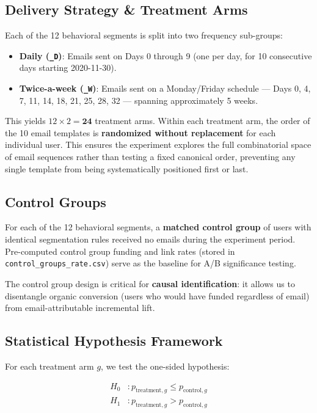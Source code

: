 \documentclass[12pt,a4paper]{article}
\begin{document}
\subsection{Delivery Strategy \& Treatment Arms}

Each of the 12 behavioral segments is split into two frequency sub-groups:

\begin{itemize}[leftmargin=2em]
  \item \textbf{Daily (\texttt{\_D})}: Emails sent on Days 0 through 9 (one per day,
    for 10 consecutive days starting 2020-11-30).
  \item \textbf{Twice-a-week (\texttt{\_W})}: Emails sent on a Monday/Friday schedule —
    Days 0, 4, 7, 11, 14, 18, 21, 25, 28, 32 — spanning approximately 5 weeks.
\end{itemize}

This yields $12 \times 2 = \mathbf{24}$ treatment arms. Within each treatment arm,
the order of the 10 email templates is \textbf{randomized without replacement} for
each individual user. This ensures the experiment explores the full combinatorial
space of email sequences rather than testing a fixed canonical order, preventing
any single template from being systematically positioned first or last.

\subsection{Control Groups}

For each of the 12 behavioral segments, a \textbf{matched control group} of users
with identical segmentation rules received no emails during the experiment period.
Pre-computed control group funding and link rates (stored in
\texttt{control\_groups\_rate.csv}) serve as the baseline for A/B significance testing.

The control group design is critical for \textbf{causal identification}: it allows us
to disentangle organic conversion (users who would have funded regardless of email)
from email-attributable incremental lift.

\subsection{Statistical Hypothesis Framework}

For each treatment arm $g$, we test the one-sided hypothesis:

\begin{align}
  H_0 &: p_{\text{treatment},g} \leq p_{\text{control},g} \\
  H_1 &: p_{\text{treatment},g} > p_{\text{control},g}
\end{align}
\end{document}
